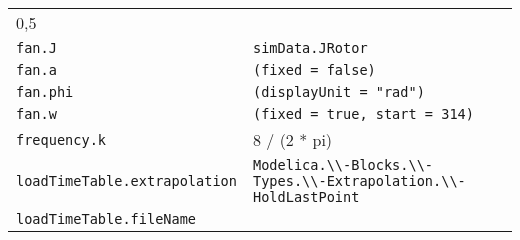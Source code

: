 \begin{longtable}[]{@{}ll@{}}
\begin{minipage}[t]{0.63\columnwidth}
0,5\strut
\end{minipage}\tabularnewline
\begin{minipage}[t]{0.31\columnwidth}\raggedright
\texttt{fan.J}\strut
\end{minipage} & \begin{minipage}[t]{0.63\columnwidth}\raggedright
\texttt{simData.JRotor}\strut
\end{minipage}\tabularnewline
\begin{minipage}[t]{0.31\columnwidth}\raggedright
\texttt{fan.a}\strut
\end{minipage} & \begin{minipage}[t]{0.63\columnwidth}\raggedright
\texttt{(fixed\ =\ false)}\strut
\end{minipage}\tabularnewline
\begin{minipage}[t]{0.31\columnwidth}\raggedright
\texttt{fan.phi}\strut
\end{minipage} & \begin{minipage}[t]{0.63\columnwidth}\raggedright
\texttt{(displayUnit\ =\ "rad")}\strut
\end{minipage}\tabularnewline
\begin{minipage}[t]{0.31\columnwidth}\raggedright
\texttt{fan.w}\strut
\end{minipage} & \begin{minipage}[t]{0.63\columnwidth}\raggedright
\texttt{(fixed\ =\ true,\ start\ =\ 314)}\strut
\end{minipage}\tabularnewline
\begin{minipage}[t]{0.31\columnwidth}\raggedright
\texttt{frequency.k}\strut
\end{minipage} & \begin{minipage}[t]{0.63\columnwidth}\raggedright
8 / (2 * pi)\strut
\end{minipage}\tabularnewline
\begin{minipage}[t]{0.31\columnwidth}\raggedright
\texttt{loadTimeTable.extrapolation}\strut
\end{minipage} & \begin{minipage}[t]{0.63\columnwidth}\raggedright
\texttt{Modelica.\textbackslash{}\textbackslash{}-Blocks.\textbackslash{}\textbackslash{}-Types.\textbackslash{}\textbackslash{}-Extrapolation.\textbackslash{}\textbackslash{}-HoldLastPoint}\strut
\end{minipage}\tabularnewline
\begin{minipage}[t]{0.31\columnwidth}\raggedright
\texttt{loadTimeTable.fileName}\strut
\end{minipage} & \begin{minipage}[t]{0.63\columnwidth}\raggedright

\end{minipage}
\end{longtable}
